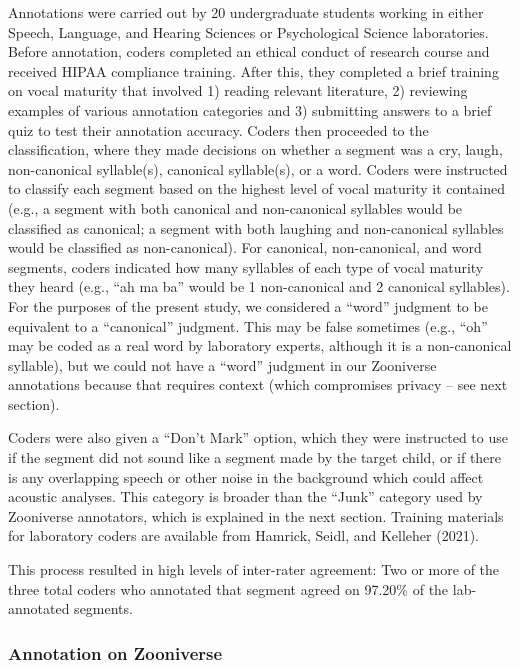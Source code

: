 \documentclass[
  english,
  ,man]{apa6}
\begin{document}
Annotations were carried out by 20 undergraduate students working in either Speech, Language, and Hearing Sciences or Psychological Science laboratories. Before annotation, coders completed an ethical conduct of research course and received HIPAA compliance training. After this, they completed a brief training on vocal maturity that involved 1) reading relevant literature, 2) reviewing examples of various annotation categories and 3) submitting answers to a brief quiz to test their annotation accuracy. Coders then proceeded to the classification, where they made decisions on whether a segment was a cry, laugh, non-canonical syllable(s), canonical syllable(s), or a word. Coders were instructed to classify each segment based on the highest level of vocal maturity it contained (e.g., a segment with both canonical and non-canonical syllables would be classified as canonical; a segment with both laughing and non-canonical syllables would be classified as non-canonical). For canonical, non-canonical, and word segments, coders indicated how many syllables of each type of vocal maturity they heard (e.g., ``ah ma ba'' would be 1 non-canonical and 2 canonical syllables). For the purposes of the present study, we considered a ``word'' judgment to be equivalent to a ``canonical'' judgment. This may be false sometimes (e.g., ``oh'' may be coded as a real word by laboratory experts, although it is a non-canonical syllable), but we could not have a ``word'' judgment in our Zooniverse annotations because that requires context (which compromises privacy -- see next section).

Coders were also given a ``Don't Mark'' option, which they were instructed to use if the segment did not sound like a segment made by the target child, or if there is any overlapping speech or other noise in the background which could affect acoustic analyses. This category is broader than the ``Junk'' category used by Zooniverse annotators, which is explained in the next section. Training materials for laboratory coders are available from Hamrick, Seidl, and Kelleher (2021).

This process resulted in high levels of inter-rater agreement: Two or more of the three total coders who annotated that segment agreed on 97.20\% of the lab-annotated segments.

\hypertarget{annotation-on-zooniverse}{%
\subsubsection{Annotation on Zooniverse}\label{annotation-on-zooniverse}}
\end{document}
